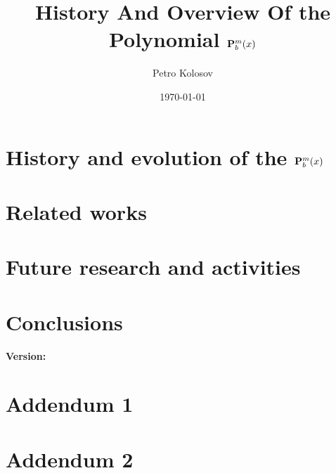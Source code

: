 \documentclass[12pt,letterpaper,oneside,reqno]{amsart}
\title[History And Overview Of the Polynomial \texorpdfstring{$\polynomialP{m}{b}{x}$}{P[m,b,x]}]
{History And Overview Of the Polynomial \texorpdfstring{$\polynomialP{m}{b}{x}$}{P[m,b,x]}}
\author[Petro Kolosov]{Petro Kolosov}
\date{\today}
\newcommand \polynomialP [4][P]{{\mathbf{#1}}\sp{#2} \sb{#3}(#4)}
\numberwithin{equation}{section}
\begin{document}
    \begin{abstract}
        
    \end{abstract}

    \maketitle

    \tableofcontents


    \section{History and evolution of the \texorpdfstring{$\polynomialP{m}{b}{x}$}{P[m,b,x]}}
    \label{sec:history-and-evolution-of-the-topic}
    


    \section{Related works}\label{sec:related-works}
    


    \section{Future research and activities}\label{sec:future-research}
    


    \section{Conclusions}\label{sec:conclusions}
    

    
    
    \noindent \textbf{Version:} 

    \section{Addendum 1}
    

    \section{Addendum 2}
    
\end{document}

